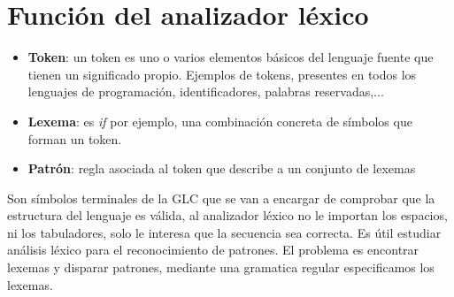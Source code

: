 \section{Función del analizador léxico}
\begin{itemize}
	\item \textbf{Token}: un token es uno o varios elementos básicos del lenguaje fuente que tienen un significado propio. Ejemplos de tokens, presentes en todos los lenguajes de programación, identificadores, palabras reservadas,...
	\item \textbf{Lexema}: es \textit{if} por ejemplo, una combinación concreta de símbolos que forman un token.
	\item \textbf{Patrón}: regla asociada al token que describe a un conjunto de lexemas
\end{itemize}
Son símbolos terminales de la GLC que se van a encargar de comprobar que la estructura del lenguaje es válida, al analizador léxico no le importan los espacios, ni los tabuladores, solo le interesa que la secuencia sea correcta.
\newline
\newline
Es útil estudiar análisis léxico para el reconocimiento de patrones.
\newline
\newline
El problema es encontrar lexemas y disparar patrones, mediante una gramatica regular especificamos los lexemas.

